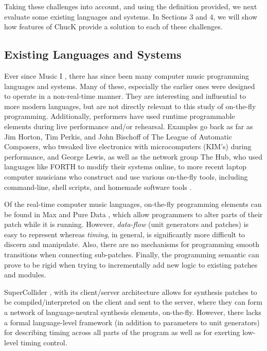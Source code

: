 Taking these challenges into account, and using the definition provided, we next evaluate some existing languages and systems.  In Sections 3 and 4, we will show how features of ChucK provide a solution to each of these challenges.

\subsection{Existing Languages and Systems}

Ever since Music I \cite{Lyon:2002}, there has since been many computer music programming
languages and systems. \cite{Cook:1999a,Dannenberg:1997,Loy:1985,Lyon:2002,Pope:1993}  Many of these, especially the earlier
ones were designed to operate in a non-real-time manner.  They are interesting
and influential to more modern languages, but are not directly relevant to this
study of on-the-fly programming.  Additionally, performers have used runtime
programmable elements during live performance and/or rehearsal. Examples go back
as far as Jim Horton, Tim Perkis, and John Bischoff of The League of Automatic
Composers, who tweaked live electronics with microcomputers (KIM's) during
performance, and George Lewis, as well as the network group The Hub, who used
languages like FORTH to modify their systems online, to more recent laptop
computer musicians who construct and use various on-the-fly tools, including
command-line, shell scripts, and homemade software tools \cite{Collins:2003}.

Of the real-time computer music languages, on-the-fly programming elements can
be found in Max \cite{Puckette:1991} and Pure Data \cite{Puckette:1996}, which allow programmers to alter parts
of their patch while it is running.  However, \textit{data-flow} (unit generators
and patches) is easy to represent whereas \textit{timing}, in general, is
significantly more difficult to discern and manipulate.  Also, there are no
mechanisms for programming smooth transitions when connecting sub-patches. 
Finally, the programming semantic can prove to be rigid when trying to
incrementally add new logic to existing patches and modules.

SuperCollider \cite{McCartney:2002}, with its client/server architecture allows for synthesis
patches to be compiled/interpreted on the client and sent to the server, where
they can form a network of language-neutral synthesis elements, on-the-fly. 
However, there lacks a formal language-level framework (in addition to parameters
to unit generators) for describing timing across all parts of the program as well
as for exerting low-level timing control.

